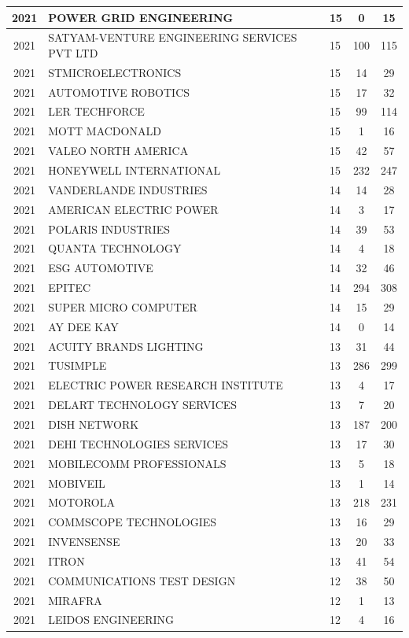 \documentclass{article}%
\begin{document}
\begin{longtable}{c|p{20em}|p{5em}|c|c}
\hline%
2021&POWER GRID ENGINEERING&15&0&15\\%
\hline%
2021&SATYAM{-}VENTURE ENGINEERING SERVICES PVT LTD&15&100&115\\%
\hline%
2021&STMICROELECTRONICS&15&14&29\\%
\hline%
2021&AUTOMOTIVE ROBOTICS&15&17&32\\%
\hline%
2021&LER TECHFORCE&15&99&114\\%
\hline%
2021&MOTT MACDONALD&15&1&16\\%
\hline%
2021&VALEO NORTH AMERICA&15&42&57\\%
\hline%
2021&HONEYWELL INTERNATIONAL&15&232&247\\%
\hline%
2021&VANDERLANDE INDUSTRIES&14&14&28\\%
\hline%
2021&AMERICAN ELECTRIC POWER&14&3&17\\%
\hline%
2021&POLARIS INDUSTRIES&14&39&53\\%
\hline%
2021&QUANTA TECHNOLOGY&14&4&18\\%
\hline%
2021&ESG AUTOMOTIVE&14&32&46\\%
\hline%
2021&EPITEC&14&294&308\\%
\hline%
2021&SUPER MICRO COMPUTER&14&15&29\\%
\hline%
2021&AY DEE KAY&14&0&14\\%
\hline%
2021&ACUITY BRANDS LIGHTING&13&31&44\\%
\hline%
2021&TUSIMPLE&13&286&299\\%
\hline%
2021&ELECTRIC POWER RESEARCH INSTITUTE&13&4&17\\%
\hline%
2021&DELART TECHNOLOGY SERVICES&13&7&20\\%
\hline%
2021&DISH NETWORK&13&187&200\\%
\hline%
2021&DEHI TECHNOLOGIES SERVICES&13&17&30\\%
\hline%
2021&MOBILECOMM PROFESSIONALS&13&5&18\\%
\hline%
2021&MOBIVEIL&13&1&14\\%
\hline%
2021&MOTOROLA&13&218&231\\%
\hline%
2021&COMMSCOPE TECHNOLOGIES&13&16&29\\%
\hline%
2021&INVENSENSE&13&20&33\\%
\hline%
2021&ITRON&13&41&54\\%
\hline%
2021&COMMUNICATIONS TEST DESIGN&12&38&50\\%
\hline%
2021&MIRAFRA&12&1&13\\%
\hline%
2021&LEIDOS ENGINEERING&12&4&16\\%

\end{longtable}
\end{document}
